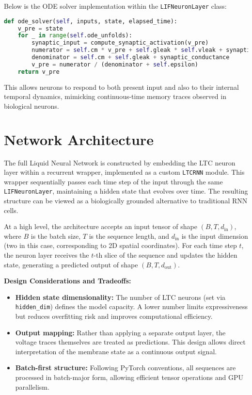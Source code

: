 \noindent Below is the ODE solver implementation within the \texttt{LIFNeuronLayer} class:
\begin{lstlisting}[language=Python, caption={Simplified LTC neuron forward method}]
def ode_solver(self, inputs, state, elapsed_time):
    v_pre = state
    for _ in range(self.ode_unfolds):
        synaptic_input = compute_synaptic_activation(v_pre)
        numerator = self.cm * v_pre + self.gleak * self.vleak + synaptic_input
        denominator = self.cm + self.gleak + synaptic_conductance
        v_pre = numerator / (denominator + self.epsilon)
    return v_pre
\end{lstlisting}
This allows neurons to respond to both present input and also to their internal temporal dynamics, mimicking continuous-time memory traces observed in biological neurons.

\section{Network Architecture}
The full Liquid Neural Network is constructed by embedding the LTC neuron layer within a recurrent wrapper, implemented as a custom \texttt{LTCRNN} module. This wrapper sequentially passes each time step of the input through the same \texttt{LIFNeuronLayer}, maintaining a hidden state that evolves over time. The resulting structure can be viewed as a biologically grounded alternative to traditional RNN cells.

At a high level, the architecture accepts an input tensor of shape $(B, T, d_{\text{in}})$, where $B$ is the batch size, $T$ is the sequence length, and $d_{\text{in}}$ is the input dimension (two in this case, corresponding to 2D spatial coordinates). For each time step $t$, the neuron layer receives the $t$-th slice of the sequence and updates the hidden state, generating a predicted output of shape $(B, T, d_{\text{out}})$.

\vspace{1em}
\noindent \textbf{Design Considerations and Tradeoffs:}
\begin{itemize}
    \item \textbf{Hidden state dimensionality:} The number of LTC neurons (set via \texttt{hidden\_dim}) defines the model capacity. A lower number limits expressiveness but reduces overfitting risk and improves computational efficiency.
    \item \textbf{Output mapping:} Rather than applying a separate output layer, the voltage traces themselves are treated as predictions. This design allows direct interpretation of the membrane state as a continuous output signal.
    \item \textbf{Batch-first structure:} Following PyTorch conventions, all sequences are processed in batch-major form, allowing efficient tensor operations and GPU parallelism.
\end{itemize}

